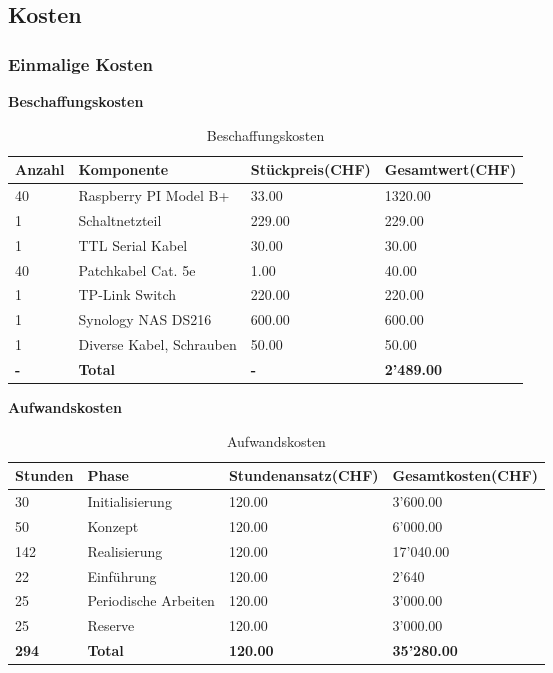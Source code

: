 
\subsection{Kosten}

\subsubsection{Einmalige Kosten}
\textbf{Beschaffungskosten}
\begin{table}[H]
\centering
\begin{tabular}{p{2cm}p{5cm}p{4cm}p{4cm}}
\hline
\rowcolor{heading} \textbf{Anzahl} & \textbf{Komponente} & \textbf{Stückpreis(CHF)} &\textbf{Gesamtwert(CHF)} \\\hline
40 & Raspberry PI Model B+ & 33.00 & 1320.00 \\\hline
1 & Schaltnetzteil & 229.00 & 229.00 \\\hline
1 & TTL Serial Kabel & 30.00 & 30.00 \\\hline
40 & Patchkabel Cat. 5e & 1.00 & 40.00 \\\hline
1 & TP-Link Switch & 220.00 & 220.00 \\\hline
1 & Synology NAS DS216 & 600.00 & 600.00 \\\hline
1 & Diverse Kabel, Schrauben & 50.00 & 50.00 \\\hline
\rowcolor{subheading}\textbf{-} & \textbf{Total} & \textbf{-} & \textbf{2'489.00} \\\hline
\end{tabular}
\caption{Beschaffungskosten}
\end{table}

\textbf{Aufwandskosten}
\begin{table}[H]
\centering
\begin{tabular}{p{2cm}p{5cm}p{4cm}p{4cm}}
\hline
\rowcolor{heading} \textbf{Stunden} & \textbf{Phase} & \textbf{Stundenansatz(CHF)} &\textbf{Gesamtkosten(CHF)} \\\hline
30 & Initialisierung & 120.00 & 3'600.00 \\\hline
50 & Konzept & 120.00 & 6'000.00 \\\hline
142 & Realisierung & 120.00 & 17'040.00 \\\hline
22 & Einführung & 120.00 & 2'640 \\\hline
25 & Periodische Arbeiten & 120.00 & 3'000.00 \\\hline
25 & Reserve & 120.00 & 3'000.00 \\\hline
\rowcolor{subheading}\textbf{294} & \textbf{Total} & \textbf{120.00} & \textbf{35'280.00} \\\hline
\end{tabular}
\caption{Aufwandskosten}
\end{table}

